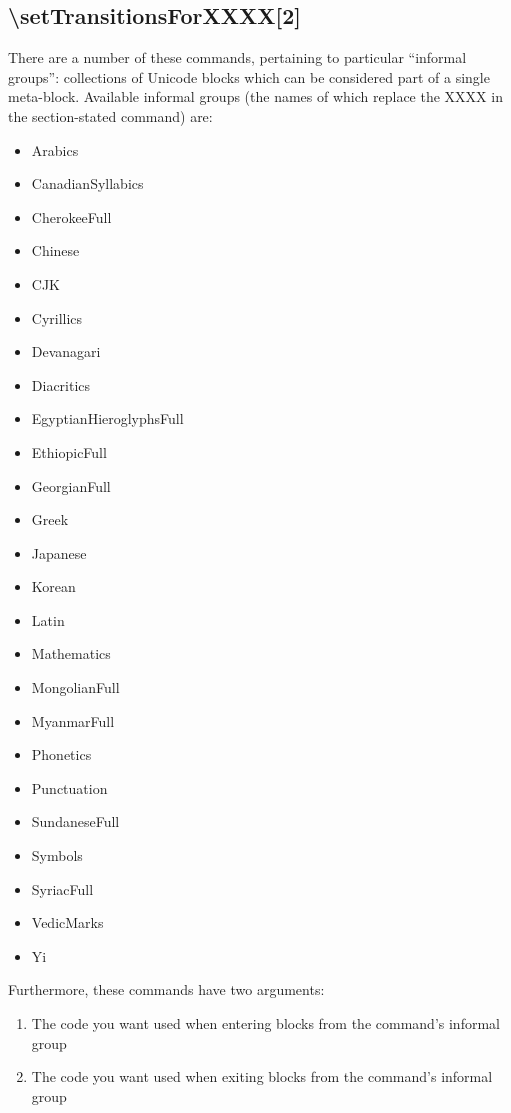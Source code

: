 \documentclass{article}
\newenvironment{itemlist}{%
  \begin{itemize}
  \setlength{\itemsep}{0pt}
  \setlength{\parsep}{0pt}
  \setlength{\topsep}{0pt}
  \setlength{\partopsep}{0pt}
  \setlength{\parskip}{0pt}
  \setlength{\labelsep}{5pt}}%
{
  \end{itemize}}
\newenvironment{numberlist}{%
  \begin{enumerate}
  \setlength{\itemsep}{0pt}
  \setlength{\parsep}{0pt}
  \setlength{\topsep}{0pt}
  \setlength{\partopsep}{0pt}
  \setlength{\parskip}{0pt}
  \setlength{\labelsep}{5pt}}%
{
  \end{enumerate}}
\begin{document}
    \subsection{\textbackslash setTransitionsForXXXX[2]}

      There are a number of these commands, pertaining to particular “informal groups”: collections of Unicode blocks which can be considered part of a single meta-block. Available informal groups (the names of which replace the XXXX in the section-stated command) are:

      \begin{itemlist}
        \item Arabics
        \item CanadianSyllabics
        \item CherokeeFull
        \item Chinese
        \item CJK
        \item Cyrillics
        \item Devanagari
        \item Diacritics
        \item EgyptianHieroglyphsFull
        \item EthiopicFull
        \item GeorgianFull
        \item Greek
        \item Japanese
        \item Korean
        \item Latin
        \item Mathematics
        \item MongolianFull
        \item MyanmarFull
        \item Phonetics
        \item Punctuation
        \item SundaneseFull
        \item Symbols
        \item SyriacFull
        \item VedicMarks
        \item Yi
      \end{itemlist}

      Furthermore, these commands have two arguments:

      \begin{numberlist}
        \item The code you want used when entering blocks from the command's informal group
        \item The code you want used when exiting blocks from the command's informal group
      \end{numberlist}
\end{document}
